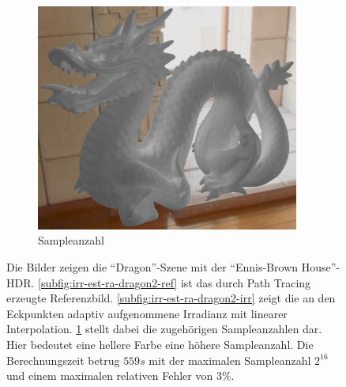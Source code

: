 \begin{figure}[h]
\begin{subfigure}[t]{0.33\textwidth}
			\end{subfigure}
			\begin{subfigure}[t]{0.33\textwidth}
				\center
				\includegraphics[width=0.95\textwidth]{pic/irr_est-ra-dragon2-scount.png}
				\caption{Sampleanzahl}
				\label{subfig:irr-est-ra-dragon2-scount}
			\end{subfigure}
			\caption[Vertex Lighting anhand der \enquote{Dragon}-Szene mit \enquote{Ennis-Brown House}-HDR]{Die Bilder zeigen die \enquote{Dragon}-Szene mit der \enquote{Ennis-Brown House}-HDR. \ref{subfig:irr-est-ra-dragon2-ref} ist das durch Path Tracing erzeugte Referenzbild. \ref{subfig:irr-est-ra-dragon2-irr} zeigt die an den Eckpunkten adaptiv aufgenommene Irradianz mit linearer Interpolation. \ref{subfig:irr-est-ra-dragon2-scount} stellt dabei die zugehörigen Sampleanzahlen dar. Hier bedeutet eine hellere Farbe eine höhere Sampleanzahl. Die Berechnungszeit betrug $559\unit{s}$ mit der maximalen Sampleanzahl $2^{16}$ und einem maximalen relativen Fehler von $3\unit{\%}$.}
			\label{fig:irr-est-ra-dragon2}
		\end{figure}

